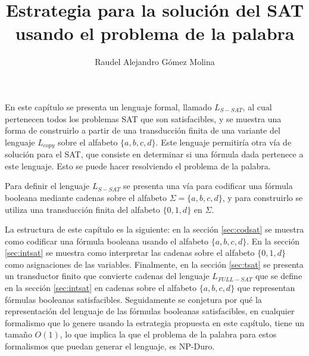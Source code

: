 \documentclass[12pt]{article}
\title{Estrategia para la solución del SAT usando el problema de la palabra}
\author{Raudel Alejandro Gómez Molina}
\begin{document}
\maketitle





En este capítulo se presenta  un lenguaje formal, llamado $L_{S-SAT}$, al cual pertenecen todos los problemas 
SAT que son satisfacibles, y se muestra una forma de construirlo a partir de una transducción finita de una variante
del lenguaje $L_{copy}$ sobre el alfabeto $\{a,b,c,d\}$. Este lenguaje 
permitiría otra vía de solución para el SAT, que consiste en determinar si una fórmula dada pertenece a este 
lenguaje. Esto se puede hacer resolviendo el problema de la palabra.

Para definir el lenguaje $L_{S-SAT}$ se presenta una vía para codificar una fórmula booleana mediante cadenas 
sobre el alfabeto $\Sigma=\{a, b,c,d\}$, y para construirlo se utiliza una transducción finita del 
alfabeto $\{0,1,d\}$ en $\Sigma$. 

La estructura de este capítulo es la siguiente: en la sección \ref{sec:codsat} se muestra como codificar
una fórmula booleana usando el alfabeto $\{a,b,c,d\}$. En la sección \ref{sec:intsat} se muestra como interpretar 
las cadenas sobre el alfabeto $\{0,1,d\}$ como asignaciones de las variables. Finalmente, en la sección \ref{sec:tsat}
se presenta un transductor finito que convierte cadenas del lenguaje $L_{FULL-SAT}$ que se define en la sección \ref{sec:intsat}
en cadenas sobre el alfabeto $\{a,b,c,d\}$ que representan fórmulas booleanas satisfacibles. Seguidamente se 
conjetura por qué la representación del lenguaje de las fórmulas booleanas satisfacibles, en 
cualquier formalismo que lo genere usando la estrategia propuesta en este capítulo, tiene un tamaño $O(1)$, 
lo que implica la que el problema de la palabra para estos formalismos que puedan generar el lenguaje, es NP-Duro.
\end{document}
